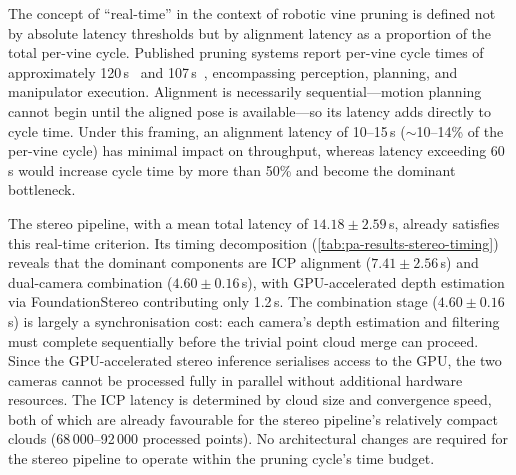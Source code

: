The concept of ``real-time'' in the context of robotic vine pruning is defined not by absolute latency thresholds but by alignment latency as a proportion of the total per-vine cycle. Published pruning systems report per-vine cycle times of approximately 120\,s~\cite{botterillRobotSystemPruning2017} and 107\,s~\cite{hizatateDevelopmentRobotPruning2025}, encompassing perception, planning, and manipulator execution. Alignment is necessarily sequential---motion planning cannot begin until the aligned pose is available---so its latency adds directly to cycle time. Under this framing, an alignment latency of 10--15\,s ($\sim$10--14\% of the per-vine cycle) has minimal impact on throughput, whereas latency exceeding 60\,s would increase cycle time by more than 50\% and become the dominant bottleneck.

The stereo pipeline, with a mean total latency of $14.18 \pm 2.59$\,s, already satisfies this real-time criterion. Its timing decomposition (\cref{tab:pa-results-stereo-timing}) reveals that the dominant components are ICP alignment ($7.41 \pm 2.56$\,s) and dual-camera combination ($4.60 \pm 0.16$\,s), with GPU-accelerated depth estimation via FoundationStereo contributing only 1.2\,s. The combination stage ($4.60 \pm 0.16$\,s) is largely a synchronisation cost: each camera's depth estimation and filtering must complete sequentially before the trivial point cloud merge can proceed. Since the GPU-accelerated stereo inference serialises access to the GPU, the two cameras cannot be processed fully in parallel without additional hardware resources. The ICP latency is determined by cloud size and convergence speed, both of which are already favourable for the stereo pipeline's relatively compact clouds (68\,000--92\,000 processed points). No architectural changes are required for the stereo pipeline to operate within the pruning cycle's time budget.

